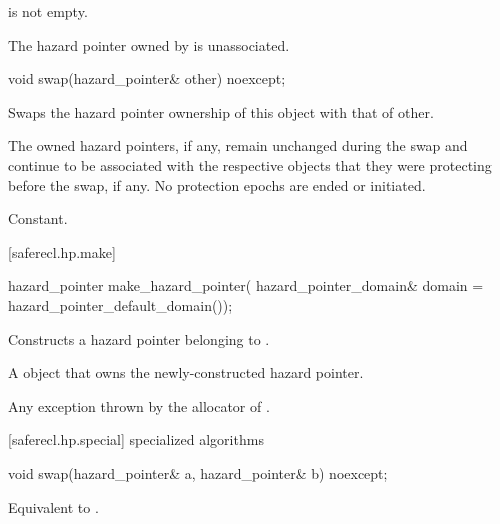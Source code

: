 \begin{itemdescr}

\expects
{} is not empty.

\ensures
The hazard pointer owned by  is unassociated.

\end{itemdescr}

\begin{itemdecl}
void swap(hazard_pointer& other) noexcept;
\end{itemdecl}

\begin{itemdescr}

\effects 
Swaps the hazard pointer ownership of this object with that of other. \begin{note} The owned hazard pointers, if any, remain unchanged during the swap and continue to be associated with the respective objects that they were protecting before the swap, if any. No protection epochs are ended or initiated.\end{note}

\complexity 
Constant.

\end{itemdescr}

[saferecl.hp.make]{}

\begin{itemdecl}
hazard_pointer make_hazard_pointer(
  hazard_pointer_domain& domain = hazard_pointer_default_domain());
\end{itemdecl}

\begin{itemdescr}

\effects 
Constructs a hazard pointer belonging to .

\returns 
A  object that owns the newly-constructed hazard pointer.

\throws 
Any exception thrown by the allocator of .

\end{itemdescr}

[saferecl.hp.special]{ specialized algorithms}

\begin{itemdecl}
void swap(hazard_pointer& a, hazard_pointer& b) noexcept;
\end{itemdecl}

\begin{itemdescr}

\effects 
Equivalent to .

\end{itemdescr}
